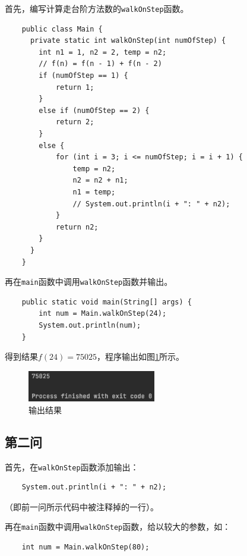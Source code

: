 \documentclass[11pt]{homework}
\begin{document}
首先，编写计算走台阶方法数的\verb|walkOnStep|函数。
\lstset{language=java}
  \begin{lstlisting}
    public class Main {
      private static int walkOnStep(int numOfStep) {
        int n1 = 1, n2 = 2, temp = n2;
        // f(n) = f(n - 1) + f(n - 2)
        if (numOfStep == 1) {
            return 1;
        }
        else if (numOfStep == 2) {
            return 2;
        }
        else {
            for (int i = 3; i <= numOfStep; i = i + 1) {
                temp = n2;
                n2 = n2 + n1;
                n1 = temp;
                // System.out.println(i + ": " + n2);
            }
            return n2;
        }
      }
    }
  \end{lstlisting}

再在\verb|main|函数中调用\verb|walkOnStep|函数并输出。
\lstset{language=java}
  \begin{lstlisting}
    public static void main(String[] args) {
        int num = Main.walkOnStep(24);
        System.out.println(num);
    }
  \end{lstlisting}

得到结果$f(24) = 75025$，程序输出如图\ref{q1_output}所示。

\begin{figure}
  \centering
  \includegraphics[width=0.5\textwidth]{q1_output}
  \caption{输出结果}
  \label{q1_output}
\end{figure}

\subsection*{第二问}
首先，在\verb|walkOnStep|函数添加输出：
\lstset{language=java}
  \begin{lstlisting}
    System.out.println(i + ": " + n2);
  \end{lstlisting}
（即前一问所示代码中被注释掉的一行）。

再在\verb|main|函数中调用\verb|walkOnStep|函数，给以较大的参数，如：
\lstset{language=java}
  \begin{lstlisting}
    int num = Main.walkOnStep(80);
  \end{lstlisting}
\end{document}
